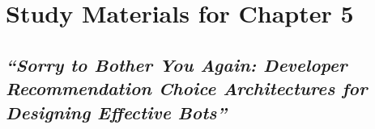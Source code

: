 \chapter{Study Materials for Chapter 5}

\section{\em ``Sorry to Bother You Again: Developer Recommendation Choice Architectures for Designing Effective Bots''}






